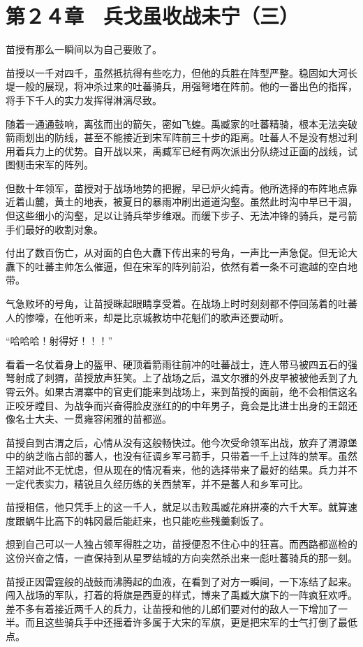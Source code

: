 \section{第２４章　兵戈虽收战未宁（三） }

苗授有那么一瞬间以为自己要败了。

苗授以一千对四千，虽然抵抗得有些吃力，但他的兵胜在阵型严整。稳固如大河长堤一般的展现，将冲杀过来的吐蕃骑兵，用强弩堵在阵前。他的一番出色的指挥，将手下千人的实力发挥得淋漓尽致。

随着一通通鼓响，离弦而出的箭矢，密如飞蝗。禹臧家的吐蕃精骑，根本无法突破箭雨划出的防线，甚至不能接近到宋军阵前三十步的距离。吐蕃人不是没有想过利用着兵力上的优势。自开战以来，禹臧军已经有两次派出分队绕过正面的战线，试图侧击宋军的阵列。

但数十年领军，苗授对于战场地势的把握，早已炉火纯青。他所选择的布阵地点靠近着山麓，黄土的地表，被夏日的暴雨冲刷出道道沟壑。虽然此时沟中早已干涸，但这些细小的沟壑，足以让骑兵举步维艰。而缓下步子、无法冲锋的骑兵，是弓箭手们最好的收割对象。

付出了数百伤亡，从对面的白色大纛下传出来的号角，一声比一声急促。但无论大纛下的吐蕃主帅怎么催逼，但在宋军的阵列前沿，依然有着一条不可逾越的空白地带。

气急败坏的号角，让苗授眯起眼睛享受着。在战场上时时刻刻都不停回荡着的吐蕃人的惨嚎，在他听来，却是比京城教坊中花魁们的歌声还要动听。

“哈哈哈！射得好！！！”

看着一名仗着身上的盔甲、硬顶着箭雨往前冲的吐蕃战士，连人带马被四五石的强弩射成了刺猬，苗授放声狂笑。上了战场之后，温文尔雅的外皮早被被他丢到了九霄云外。如果古渭寨中的官吏们能来到战场上，来到苗授的面前，绝不会相信这名正咬牙瞠目、为战争而兴奋得脸皮涨红的的中年男子，竟会是比进士出身的王韶还像名士大夫、一贯雍容闲雅的苗都巡。

苗授自到古渭之后，心情从没有这般畅快过。他今次受命领军出战，放弃了渭源堡中的纳芝临占部的蕃人，也没有征调乡军弓箭手，只带着一千上过阵的禁军。虽然王韶对此不无忧虑，但从现在的情况看来，他的选择带来了最好的结果。兵力并不一定代表实力，精锐且久经历练的关西禁军，并不是蕃人和乡军可比。

苗授相信，他只凭手上的这一千人，就足以击败禹臧花麻拼凑的六千大军。就算速度跟蜗牛比高下的韩冈最后能赶来，也只能吃些残羹剩饭了。

想到自己可以一人独占领军得胜之功，苗授便忍不住心中的狂喜。而西路都巡检的这份兴奋之情，一直保持到从星罗结城的方向突然杀出来一彪吐蕃骑兵的那一刻。

苗授正因雷霆般的战鼓而沸腾起的血液，在看到了对方一瞬间，一下冻结了起来。闯入战场的军队，打着的将旗是西夏的样式，博来了禹臧大旗下的一阵疯狂欢呼。差不多有着接近两千人的兵力，让苗授和他的儿郎们要对付的敌人一下增加了一半。而且这些骑兵手中还摇着许多属于大宋的军旗，更是把宋军的士气打倒了最低点。

